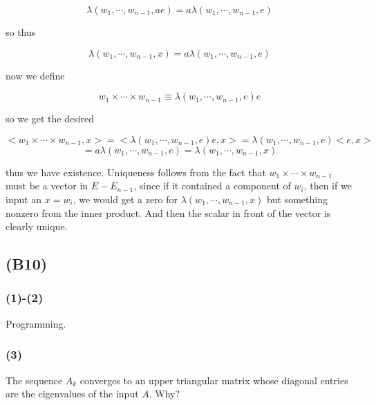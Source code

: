 \documentclass{article}
\begin{document}
\[ \lambda(w_1,\cdots,w_{n-1},ae) = a \lambda(w_1,\cdots,w_{n-1},e) \]

so thus 

\[ \lambda(w_1,\cdots,w_{n-1},x) = a \lambda(w_1,\cdots,w_{n-1},e) \]

now we define

\[ w_1 \times \cdots \times w_{n-1} \equiv \lambda(w_1,\cdots,w_{n-1},e) e\]

so we get the desired 

\[ <w_1 \times \cdots \times w_{n-1}, x> = < \lambda(w_1,\cdots,w_{n-1},e) e, x> = \lambda(w_1,\cdots,w_{n-1},e) <e, x> \]
\[= a \lambda(w_1,\cdots,w_{n-1},e) = \lambda(w_1,\cdots,w_{n-1},x)\]

thus we have existence. Uniqueness follows from the fact that $w_1 \times \cdots \times w_{n-1}$ must be a vector in $E - E_{n-1}$, since if it contained a component of $w_i$, then if we input an $x = w_i$, we would get a zero for $\lambda(w_1,\cdots,w_{n-1},x)$ but something nonzero from the inner product. And then the scalar in front of the vector is clearly unique. 


\subsection{(B10)}

\subsubsection{(1)-(2)} Programming.

\subsubsection{(3)} The sequence $A_k$ converges to an upper triangular matrix whose diagonal entries are the eigenvalues of the input $A$. Why? 
\end{document}
